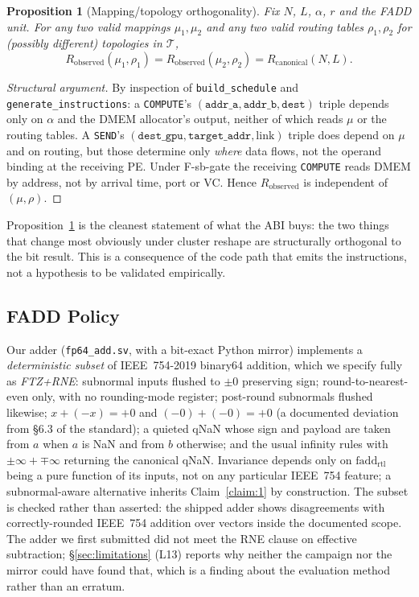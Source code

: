\documentclass[journal,10pt]{IEEEtran}
\theoremstyle{plain}
\newtheorem{proposition}{Proposition}
\theoremstyle{definition}
\theoremstyle{remark}
\newenvironment{structuralargument}{\begin{proof}[Structural argument]}{\end{proof}}
\newcommand{\fadd}{\ensuremath{\mathrm{fadd}_{\mathrm{rtl}}}}
\newcommand{\Rcan}{\ensuremath{R_{\mathrm{canonical}}}}
\newcommand{\sv}[1]{\texttt{#1}}
\newcommand{\T}{\ensuremath{\mathcal{T}}}
\newcommand{\asgn}{\ensuremath{\alpha}}
\newcommand{\map}{\ensuremath{\mu}}
\begin{document}
\begin{proposition}[Mapping/topology orthogonality]\label{thm:orth}
Fix $N$, $L$, $\asgn$, $r$ and the FADD unit. For any two valid mappings
$\map_1,\map_2$ and any two valid routing tables $\rho_1,\rho_2$ for
(possibly different) topologies in $\T$,
\begin{equation}
  R_\mathrm{observed}(\map_1, \rho_1) = R_\mathrm{observed}(\map_2, \rho_2)
  = \Rcan(N, L).
\end{equation}
\end{proposition}

\begin{structuralargument}
By inspection of \sv{build\_schedule} and \sv{generate\_instructions}: a
\texttt{COMPUTE}'s $(\texttt{addr\_a},\texttt{addr\_b},\texttt{dest})$ triple
depends only on $\asgn$ and the DMEM allocator's output, neither of which
reads $\map$ or the routing tables. A \texttt{SEND}'s
$(\texttt{dest\_gpu},\texttt{target\_addr},\text{link})$ triple does depend on
$\map$ and on routing, but those determine only \emph{where} data flows, not
the operand binding at the receiving PE. Under \textsf{F-sb-gate} the
receiving \texttt{COMPUTE} reads DMEM by address, not by arrival time, port or
VC. Hence $R_\mathrm{observed}$ is independent of $(\map,\rho)$.
\end{structuralargument}

Proposition~\ref{thm:orth} is the cleanest statement of what the ABI buys: the
two things that change most obviously under cluster reshape are structurally
orthogonal to the bit result. This is a consequence of the code path that
emits the instructions, not a hypothesis to be validated empirically.

\subsection{FADD Policy}\label{sec:fadd}

Our adder (\sv{fp64\_add.sv}, with a bit-exact Python mirror) implements a
\emph{deterministic subset} of IEEE~754-2019 binary64 addition, which we
specify fully as \emph{FTZ+RNE}: subnormal inputs flushed to $\pm0$ preserving
sign; round-to-nearest-even only, with no rounding-mode register; post-round
subnormals flushed likewise; $x+(-x) = +0$ and $(-0)+(-0) = +0$ (a documented
deviation from \S6.3 of the standard); a quieted qNaN whose sign and payload
are taken from $a$ when $a$ is NaN and from $b$ otherwise; and the usual
infinity rules with $\pm\infty + \mp\infty$ returning the canonical qNaN.
Invariance depends only on $\fadd$ being a pure function of its inputs, not on
any particular IEEE~754 feature; a subnormal-aware alternative inherits
Claim~\ref{claim:1} by construction. The subset is checked rather than
asserted: the shipped adder shows \FpSweepErrors{} disagreements with
correctly-rounded IEEE~754 addition over \FpSweepVectors{} vectors inside the
documented scope. The adder we first submitted did not meet the RNE clause on
effective subtraction; \S\ref{sec:limitations} (L13) reports why neither the
campaign nor the mirror could have found that, which is a finding about the
evaluation method rather than an erratum.
\end{document}
